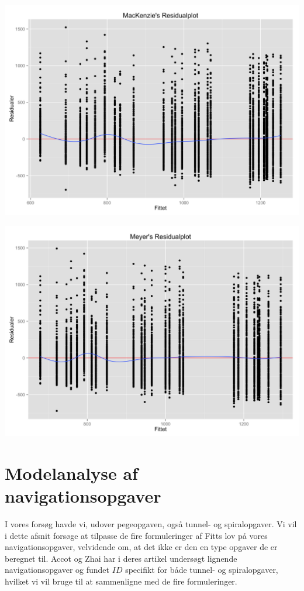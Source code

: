 \begin{minipage}{\linewidth}
\begin{minipage}{.5\linewidth}
		\includegraphics[width=\linewidth]{images/plots/plot_residual_mackenzie}
		\label{fig:plot_residual_mackenzie}
	\end{minipage}
	\begin{minipage}{.5\linewidth}
		\includegraphics[width=\linewidth]{images/plots/plot_residual_meyer}
		\label{fig:plot_residual_meyer}
	\end{minipage}
\end{minipage}

\section*{Modelanalyse af navigationsopgaver}
I vores forsøg havde vi, udover pegeopgaven, også tunnel- og spiralopgaver. Vi vil i dette afsnit forsøge at tilpasse de fire formuleringer af Fitts lov på vores navigationsopgaver, velvidende om, at det ikke er den en type opgaver de er beregnet til. Accot og Zhai har i deres artikel \cite{accot1997} undersøgt lignende navigationsopgaver og fundet $ID$ specifikt for både tunnel- og spiralopgaver, hvilket vi vil bruge til at sammenligne med de fire formuleringer.

